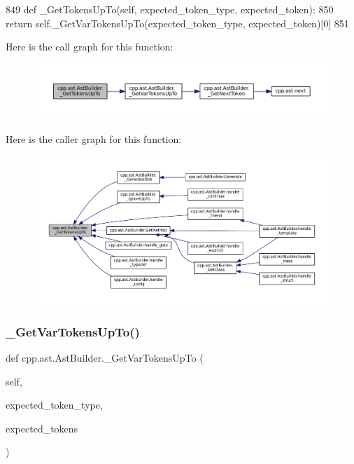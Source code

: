 \begin{DoxyCode}
849     \textcolor{keyword}{def }\_GetTokensUpTo(self, expected\_token\_type, expected\_token):
850         \textcolor{keywordflow}{return} self.\_GetVarTokensUpTo(expected\_token\_type, expected\_token)[0]
851 
\end{DoxyCode}
Here is the call graph for this function\+:
\nopagebreak
\begin{figure}[H]
\begin{center}
\leavevmode
\includegraphics[width=350pt]{classcpp_1_1ast_1_1AstBuilder_a93e70a799351e5c40f07efb218889b31_cgraph}
\end{center}
\end{figure}
Here is the caller graph for this function\+:
\nopagebreak
\begin{figure}[H]
\begin{center}
\leavevmode
\includegraphics[width=350pt]{classcpp_1_1ast_1_1AstBuilder_a93e70a799351e5c40f07efb218889b31_icgraph}
\end{center}
\end{figure}
\mbox{\label{classcpp_1_1ast_1_1AstBuilder_a0b5b10f2608ba3e8851fbd65d51b1f22}} 
\subsubsection{\texorpdfstring{\+\_\+\+Get\+Var\+Tokens\+Up\+To()}{\_GetVarTokensUpTo()}}
{\footnotesize\ttfamily def cpp.\+ast.\+Ast\+Builder.\+\_\+\+Get\+Var\+Tokens\+Up\+To (\begin{DoxyParamCaption}\item[{}]{self,  }\item[{}]{expected\+\_\+token\+\_\+type,  }\item[{}]{expected\+\_\+tokens }\end{DoxyParamCaption})\hspace{0.3cm}{\ttfamily [private]}}



